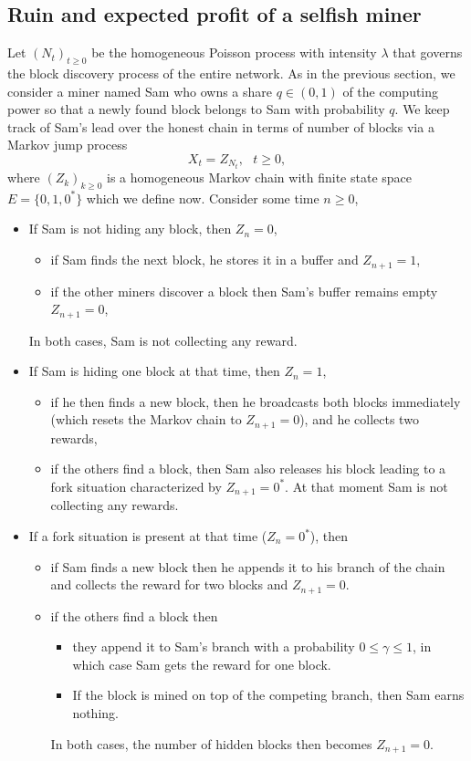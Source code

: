 \subsection{Ruin and expected profit of a selfish miner}\label{ssec:selfish_mining}
Let $(N_t)_{t\geq0}$ be the homogeneous Poisson process with intensity $\lambda$ that governs the block discovery process of the entire network. As in the previous section, we consider a miner named Sam who owns a share $q\in(0,1)$ of the computing power so that a newly found block belongs to Sam with probability $q$.  We keep track of Sam's lead over the honest chain in terms of number of blocks via a Markov jump process
$$
X_t=Z_{N_t}, \text{ }t\geq0,
$$ 
where $(Z_{k})_{k \geq 0}$ is a homogeneous Markov chain with finite state space $E = \{0,1,0^\ast\}$ which we define now. Consider some time $n\geq0$,
\begin{itemize}
\item If Sam is not hiding any block, then $Z_n = 0$, 
\begin{itemize}
\item if Sam finds the next block, he stores it in a buffer and $Z_{n+1} = 1$, 
\item if the other miners discover a block then Sam's buffer remains empty $Z_{n+1}=0$, 
\end{itemize}
In both cases, Sam is not collecting any reward.
\item If Sam is hiding one block at that time, then $Z_n = 1$,
\begin{itemize} 
\item if he then finds a new block, then he broadcasts both blocks immediately (which resets the Markov chain to $Z_{n+1}=0$), and he collects two rewards,
\item if the others find a block, then Sam also releases his block leading to a fork situation characterized by $Z_{n+1} = 0^\ast$. At that moment Sam is not collecting any rewards.
\end{itemize}
\item If a fork situation is present at that time ($Z_n = 0^{\ast}$), then 
\begin{itemize}
\item if Sam finds a new block then he appends it to his branch of the chain and collects the reward for two blocks and $Z_{n+1} = 0$.  
\item if the others find a block then 
\begin{itemize}
\item they append it to Sam's branch with a probability $0\leq \gamma \leq 1$, in which case Sam gets the reward for one block. 
\item If the block is mined on top of the competing branch, then Sam earns nothing. 
\end{itemize}
In both cases, the number of hidden blocks then becomes $Z_{n+1}=0$.
\end{itemize}
\end{itemize}

